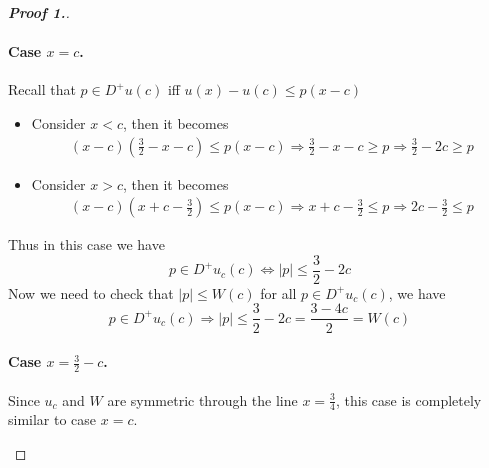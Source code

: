 \documentclass[12pt, oneside]{amsart}  	%
\begin{document}
\begin{proof}[\textbf{Proof 1.}]
\begin{itemize}
\paragraph{\textbf{Case $x = c$.}} Recall that $p\in D^+u(c)$ iff $u(x) - u(c) \leq p(x-c)$
\begin{itemize}
\item Consider $x<c$, then it becomes
\begin{align*}
(x-c)\left(\frac{3}{2}-x-c\right) \leq p(x-c) \Longrightarrow \frac{3}{2}-x-c \geq p \Longrightarrow \frac{3}{2} - 2c\geq p
\end{align*}
\item Consider $x>c$, then it becomes
\begin{align*}
(x-c)\left(x+c -\frac{3}{2}\right) \leq p(x-c) \Longrightarrow x+c -\frac{3}{2}\leq p \Longrightarrow 2c - \frac{3}{2}\leq p
\end{align*}
\end{itemize}
Thus in this case we have
\begin{equation*}
p\in D^+u_c(c) \Longleftrightarrow |p|\leq \frac{3}{2}-2c
\end{equation*}
Now we need to check that $|p|\leq W(c)$ for all $p\in D^+u_c(c)$, we have
\begin{equation*}
p\in D^+u_c(c) \Longrightarrow |p|\leq \frac{3}{2}-2c  = \frac{3-4c}{2} = W(c)
\end{equation*}
\vspace*{0.2cm}


\paragraph{\textbf{Case $x = \frac{3}{2}-c$.}} 
Since $u_c$ and $W$ are symmetric through the line $x = \frac{3}{4}$, this case is completely similar to case $x= c$.
\end{itemize}
\end{proof}
\end{document}

